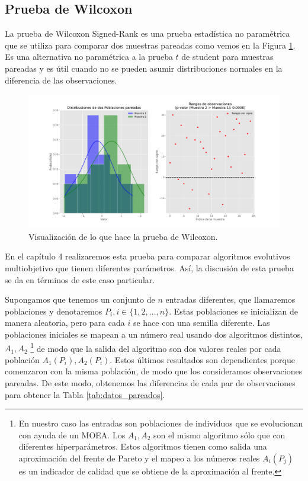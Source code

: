 \subsection{Prueba de Wilcoxon} \label{sec:Wilcoxon}

La prueba de Wilcoxon Signed-Rank \cite{Wilcoxon} es una prueba estadística no paramétrica que se utiliza para comparar dos muestras pareadas como vemos en la Figura \ref{fig:Wilcoxon}. Es una alternativa no paramétrica a la prueba $t$ de student \cite{geisserStatisticalPrinciplesExperimental1963} para muestras pareadas y es útil cuando no se pueden asumir distribuciones normales en la diferencia de las observaciones. 

\begin{figure}[H]
    \centering
    \includegraphics[width=\textwidth]{Figuras/Wilcoxon_vis.pdf}
    \caption{Visualización de lo que hace la prueba de Wilcoxon.}
    \label{fig:Wilcoxon}
\end{figure}


En el capítulo 4 realizaremos esta prueba para comparar algoritmos evolutivos multiobjetivo que tienen diferentes parámetros. Así, la discusión de esta prueba se da en términos de este caso particular.

Supongamos que tenemos un conjunto de $n$ entradas diferentes, que llamaremos poblaciones y denotaremos $P_i, i\in\{1,2,\ldots,n\}$. Estas poblaciones se inicializan de manera aleatoria, pero para cada $i$ se hace con una semilla diferente. Las poblaciones iniciales se mapean a un número real usando dos algoritmos distintos, $A_1,A_2$ \footnote{En nuestro caso las entradas son poblaciones de individuos que se evolucionan con ayuda de un MOEA. Los $A_1,A_2$ son el mismo algoritmo sólo que con diferentes hiperparámetros. Estos algoritmos tienen como salida una aproximación del frente de Pareto y el mapeo a los números reales $A_i(P_j)$ es un indicador de calidad que se obtiene de la aproximación al frente.} de modo que la salida del algoritmo son dos valores reales por cada población $A_1(P_i), A_2(P_i)$. Estos últimos resultados son dependientes porque comenzaron con la misma población, de modo que los consideramos observaciones pareadas. De este modo, obtenemos las diferencias de cada par de observaciones para obtener la Tabla \ref{tab:datos_pareados}.

